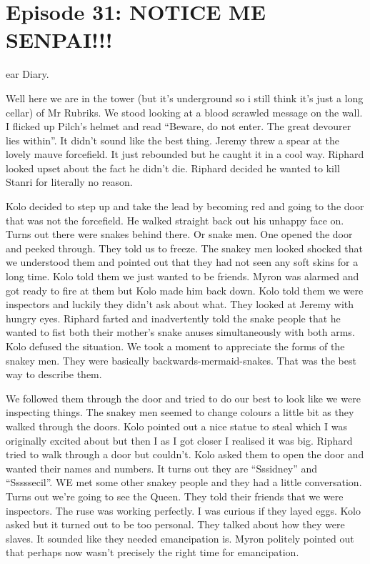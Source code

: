 \section{Episode 31: NOTICE ME SENPAI!!!}

\begin{multicols}{2}

ear Diary.\medskip

Well here we are in the tower (but it’s underground so i still think it’s just a long cellar) of Mr Rubriks. We stood looking at a blood scrawled message on the wall. I flicked up Pilch’s helmet and read “Beware, do not enter. The great devourer lies within”. It didn’t sound like the best thing. Jeremy threw a spear at the lovely mauve forcefield. It just rebounded but he caught it in a cool way. Riphard looked upset about the fact he didn’t die. Riphard decided he wanted to kill Stanri for literally no reason.\medskip

Kolo decided to step up and take the lead by becoming red and going to the door that was not the forcefield. He walked straight back out his unhappy face on. Turns out there were snakes behind there. Or snake men. One opened the door and peeked through. They told us to freeze. The snakey men looked shocked that we understood them and pointed out that they had not seen any soft skins for a long time. Kolo told them we just wanted to be friends. Myron was alarmed and got ready to fire at them but Kolo made him back down. Kolo told them we were inspectors and luckily they didn’t ask about what. They looked at Jeremy with hungry eyes. Riphard farted and inadvertently told the snake people that he wanted to fist both their mother’s snake anuses simultaneously with both arms. Kolo defused the situation. We took a moment to appreciate the forms of the snakey men. They were basically backwards-mermaid-snakes. That was the best way to describe them.\medskip

We followed them through the door and tried to do our best to look like we were inspecting things. The snakey men seemed to change colours a little bit as they walked through the doors. Kolo pointed out a nice statue to steal which I was originally excited about but then I as I got closer I realised it was big. Riphard tried to walk through a door but couldn’t. Kolo asked them to open the door and wanted their names and numbers. It turns out they are “Sssidney” and “Sssssecil”. WE met some other snakey people and they had a little conversation. Turns out we’re going to see the Queen. They told their friends that we were inspectors. The ruse was working perfectly. I was curious if they layed eggs. Kolo asked but it turned out to be too personal. They talked about how they were slaves. It sounded like they needed emancipation is. Myron politely pointed out that perhaps now wasn’t precisely the right time for emancipation.\medskip


\end{multicols}
